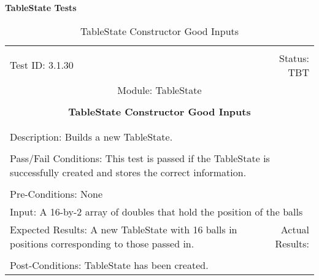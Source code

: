 \documentclass[titlepage]{article}
\begin{document}
\large{\textbf{TableState Tests}}
\begin{center}%
\begin{table}
\begin{tabular}{|l r|}\hline&\\[-2mm]
	Test ID: 3.1.30	&Status: TBT\\[-3mm]
	\multicolumn{2}{|c|}{Module: TableState}\\&\\
	\multicolumn{2}{|c|}{\textbf{\large{TableState Constructor Good Inputs}}}\\&\\\hline&\\[-3mm]
	\multicolumn{2}{|p{\textwidth}|}{Description: Builds a new TableState.}\\[1mm]\hline&\\[-3mm]
	\multicolumn{2}{|p{\textwidth}|}{Pass/Fail Conditions: This test is passed if the TableState is successfully created and stores the correct information.}\\[1mm]\hline&\\[-3mm]
	\multicolumn{2}{|p{\textwidth}|}{Pre-Conditions: None}\\[4mm]
	\multicolumn{2}{|p{\textwidth}|}{Input: A 16-by-2 array of doubles that hold the position of the balls}\\[2mm]\hline
	\multicolumn{1}{|p{0.49\textwidth}}{Expected Results: A new TableState with 16 balls in positions corresponding to those passed in.}	&\multicolumn{1}{|p{0.45\textwidth}|}{Actual Results: }\\\hline&\\[-3mm]
	\multicolumn{2}{|p{\textwidth}|}{Post-Conditions: TableState has been created.}\\\hline
\end{tabular}
\caption{TableState Constructor Good Inputs}
\end{table}
\end{center}
\end{document}
